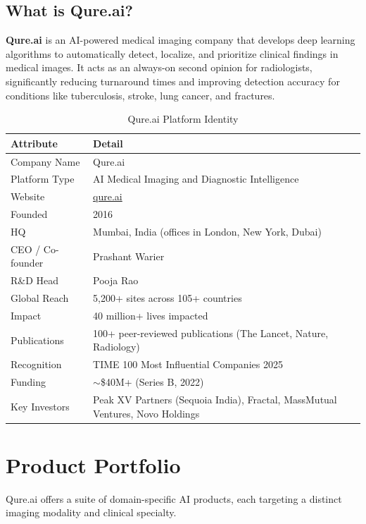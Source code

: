 \documentclass[12pt,a4paper]{article}
\begin{document}
\subsection{What is Qure.ai?}
\textbf{Qure.ai} is an AI-powered medical imaging company that develops deep learning algorithms to automatically detect, localize, and prioritize clinical findings in medical images. It acts as an always-on second opinion for radiologists, significantly reducing turnaround times and improving detection accuracy for conditions like tuberculosis, stroke, lung cancer, and fractures.

\begin{table}[H]\centering\renewcommand{\arraystretch}{1.4}
\begin{tabularx}{\textwidth}{lX}\toprule
\textbf{Attribute} & \textbf{Detail}\\\midrule
Company Name     & Qure.ai \\
Platform Type    & AI Medical Imaging and Diagnostic Intelligence \\
Website          & \href{https://qure.ai}{qure.ai} \\
Founded          & 2016 \\
HQ               & Mumbai, India (offices in London, New York, Dubai) \\
CEO / Co-founder & Prashant Warier \\
R\&D Head        & Pooja Rao \\
Global Reach     & 5,200+ sites across 105+ countries \\
Impact           & 40 million+ lives impacted \\
Publications     & 100+ peer-reviewed publications (The Lancet, Nature, Radiology) \\
Recognition      & TIME 100 Most Influential Companies 2025 \\
Funding          & $\sim$\$40M+ (Series B, 2022) \\
Key Investors    & Peak XV Partners (Sequoia India), Fractal, MassMutual Ventures, Novo Holdings \\
\bottomrule\end{tabularx}\caption{Qure.ai Platform Identity}\end{table}

\section{Product Portfolio}

Qure.ai offers a suite of domain-specific AI products, each targeting a distinct imaging modality and clinical specialty.
\end{document}
